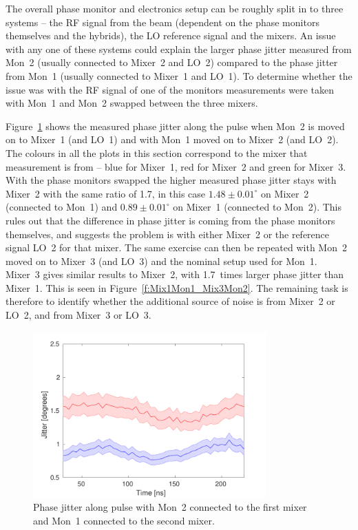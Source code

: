 The overall phase monitor and electronics setup can be roughly split in to three systems -- the RF signal from the beam (dependent on the phase monitors themselves and the hybrids), the LO reference signal and the mixers. An issue with any one of these systems could explain the larger phase jitter measured from Mon~2 (usually connected to Mixer~2 and LO~2) compared to the phase jitter from Mon~1 (usually connected to Mixer~1 and LO~1). To determine whether the issue was with the RF signal of one of the monitors measurements were taken with Mon~1 and Mon~2 swapped between the three mixers.

Figure~\ref{f:Mix1Mon2_Mix2Mon1} shows the measured phase jitter along the pulse when Mon~2 is moved on to Mixer~1 (and LO~1) and with Mon~1 moved on to Mixer~2 (and LO~2). The colours in all the plots in this section correspond to the mixer that measurement is from -- blue for Mixer~1, red for Mixer~2 and green for Mixer~3. With the phase monitors swapped the higher measured phase jitter stays with Mixer~2 with the same ratio of 1.7, in this case \(1.48\pm0.01^\circ\) on Mixer~2 (connected to Mon~1) and \(0.89\pm0.01^\circ\) on Mixer~1 (connected to Mon~2). This rules out that the difference in phase jitter is coming from the phase monitors themselves, and suggests the problem is with either Mixer~2 or the reference signal LO~2 for that mixer. The same exercise can then be repeated with Mon~2 moved on to Mixer~3 (and LO~3) and the nominal setup used for Mon~1. Mixer~3 gives similar results to Mixer~2, with 1.7~times larger phase jitter than Mixer~1. This is seen in Figure~\ref{f:Mix1Mon1_Mix3Mon2}. The remaining task is therefore to identify whether the additional source of noise is from Mixer~2 or LO~2, and from Mixer~3 or LO~3.


\begin{figure}
  \centering
  \includegraphics[width=0.8\textwidth]{Figures/phaseMons/Mix1Mon2_Mix2Mon1}
  \caption{Phase jitter along pulse with Mon~2 connected to the first mixer and Mon~1 connected to the second mixer.}
  \label{f:Mix1Mon2_Mix2Mon1}
\end{figure}

